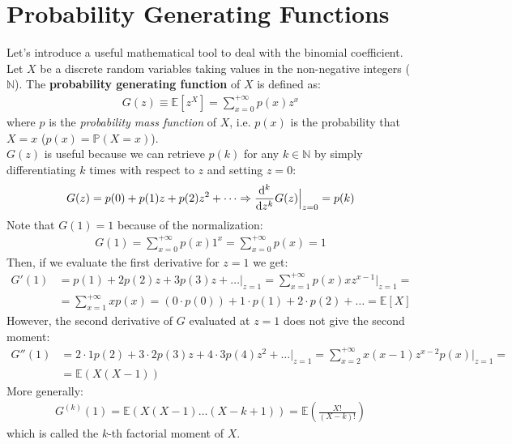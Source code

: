 \documentclass[../template.tex]{subfiles}
\begin{document}
\section{Probability Generating Functions}
Let's introduce a useful mathematical tool to deal with the binomial coefficient.\\
Let $X$ be a discrete random variables taking values in the non-negative integers ($\mathbb{N}$). The \textbf{probability generating function} of $X$ is defined as:
\begin{align*}
    G(z) \equiv \mathbb{E}[z^X] = \sum_{x=0}^{+\infty} p(x) z^x 
\end{align*}  
where $p$ is the \textit{probability mass function} of $X$, i.e. $p(x)$ is the probability that $X = x$ ($p(x) = \mathbb{P}(X=x)$).\\
$G(z)$ is useful because we can retrieve $p(k)$ for any $k \in \mathbb{N}$ by simply differentiating $k$ times with respect to $z$ and setting $z = 0$:
\begin{align*}
    G(z) = p(0) + p(1)z + p(2)z^2 + \dots \Rightarrow \dv[k]{z} G(z) \Big|_{z=0} = p(k)
\end{align*}       
Note that $G(1) = 1$ because of the normalization:
\begin{align*}
    G(1) = \sum_{x=0}^{+\infty} p(x) 1^x = \sum_{x=0}^{+\infty} p(x) = 1
\end{align*} 
Then, if we evaluate the first derivative for $z=1$ we get:
\begin{align}
    G'(1) &= p(1) + 2p(2)z + 3p(3)z + \dots \Big|_{z=1} =
    \sum_{x=1}^{+\infty} p(x) x z^{x-1} \Big|_{z=1} =\\
    &= \sum_{x=1}^{+\infty} x p(x) = (0\cdot p(0)) + 1\cdot p(1) + 2\cdot p(2) + \dots = \mathbb{E}[X] 
    \label{eqn:first-moment}
\end{align} 
However, the second derivative of $G$ evaluated at $z=1$ does not give the second moment:
\begin{align*}
    G''(1) &= 2\cdot 1 p(2) + 3\cdot 2 p(3)z + 4\cdot 3 p(4)z^2 +\dots \Big|_{z=1} = \sum_{x=2}^{+\infty} x(x-1)z^{x-2} p(x) \Big|_{z=1} =\\
    &= \mathbb{E}(X(X-1))
\end{align*}  
More generally:
\begin{align*}
    G^{(k)}(1) = \mathbb{E}(X (X-1) \dots (X-k+1)) = \mathbb{E}\left(\frac{X!}{(X-k)!} \right)
\end{align*} 
which is called the $k$-th factorial moment of $X$.\\
\end{document}
